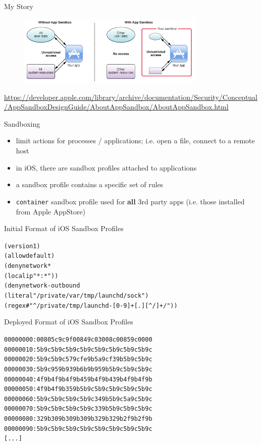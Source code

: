 \documentclass{simple}
\begin{document}
\begin{frame}{My Story}
  \begin{figure}
    \centering
    \includegraphics[width=0.8\textwidth]{img/ios-sandboxing}
  \end{figure}
  \begin{center}
    \tiny
    \url{https://developer.apple.com/library/archive/documentation/Security/Conceptual/AppSandboxDesignGuide/AboutAppSandbox/AboutAppSandbox.html}
  \end{center}
\end{frame}

\begin{frame}{Sandboxing}
  \begin{itemize}
    \pause \item limit actions for processes / applications; i.e. open a file, connect to a remote host
    \pause \item in iOS, there are sandbox profiles attached to applications
    \pause \item a sandbox profile contains a specific set of rules
    \pause \item \texttt{container} sandbox profile used for \textbf{all} 3rd party apps (i.e. those installed from Apple AppStore)
  \end{itemize}
\end{frame}

\begin{frame}[fragile]{Initial Format of iOS Sandbox Profiles}
  \begin{alltt}
(version 1)
(allow default)
(deny network*
        (local ip "*:*"))
(deny network-outbound
        (literal "/private/var/tmp/launchd/sock")
        (regex #"^/private/tmp/launchd-[0-9]+[.][^/]+/"))
  \end{alltt}
\end{frame}

\begin{frame}[fragile]{Deployed Format of iOS Sandbox Profiles}
  \begin{alltt}
00000000: 0080 5c9c 9f00 849c 0300 8c00 859c 0000
00000010: 5b9c 5b9c 5b9c 5b9c 5b9c 5b9c 5b9c 5b9c
00000020: 5b9c 5b9c 579c fe9b 5a9c f39b 5b9c 5b9c
00000030: 5b9c 959b 939b 6b9b 959b 5b9c 5b9c 5b9c
00000040: 4f9b 4f9b 4f9b 459b 4f9b 439b 4f9b 4f9b
00000050: 4f9b 4f9b 359b 5b9c 5b9c 5b9c 5b9c 5b9c
00000060: 5b9c 5b9c 5b9c 5b9c 349b 5b9c 5a9c 5b9c
00000070: 5b9c 5b9c 5b9c 5b9c 339b 5b9c 5b9c 5b9c
00000080: 329b 309b 309b 309b 329b 329b 2f9b 2f9b
00000090: 5b9c 5b9c 5b9c 5b9c 5b9c 5b9c 5b9c 5b9c
[...]
  \end{alltt}
\end{frame}
\end{document}
